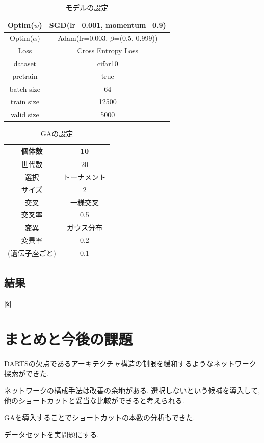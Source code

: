 \documentclass[twocolumn]{jarticle}     %
\begin{document}
\begin{table}[tb]
  \begin{center}
    \caption{モデルの設定}
    \begin{tabular}{|c|c|} \hline
      Optim($w$) & SGD(lr=0.001, momentum=0.9) \\ \hline
      Optim($\alpha$) & Adam(lr=0.003, $\beta$=(0.5, 0.999)) \\ \hline
      Loss & Cross Entropy Loss \\ \hline
      dataset & cifar10 \\ \hline
      pretrain & true \\ \hline
      batch size & 64 \\ \hline
      train size & 12500 \\ \hline
      valid size & 5000 \\ \hline
    \end{tabular}
    \label{tab:setting}
  \end{center}
\end{table}

\begin{table}[tb]
  \begin{center}
    \caption{GAの設定}
    \begin{tabular}{|c|c|} \hline
      個体数 & 10 \\ \hline
      世代数 & 20 \\ \hline \hline
      選択 & トーナメント \\ \hline
      サイズ & 2 \\ \hline \hline
      交叉 & 一様交叉 \\ \hline
      交叉率 & 0.5 \\ \hline \hline
      変異 & ガウス分布 \\ \hline
      変異率 & 0.2 \\
      (遺伝子座ごと) & 0.1 \\ \hline
    \end{tabular}
    \label{tab:setting_ga}
  \end{center}
\end{table}


\subsection{結果}
図

\section{まとめと今後の課題}
DARTSの欠点であるアーキテクチャ構造の制限を緩和するようなネットワーク探索ができた.

ネットワークの構成手法は改善の余地がある.
選択しないという候補を導入して, 他のショートカットと妥当な比較ができると考えられる.

GAを導入することでショートカットの本数の分析もできた.

データセットを実問題にする.



\end{document}
